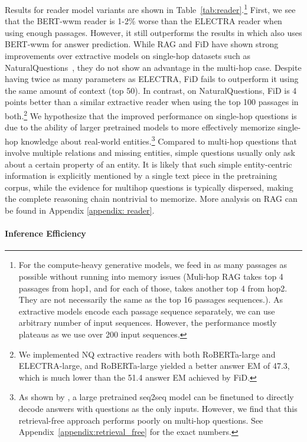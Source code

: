 \documentclass{article} \usepackage{iclr2021_conference,times}
\begin{document}
Results for reader model variants are shown in Table~\ref{tab:reader}.\footnote{For the compute-heavy generative models, we feed in as many passages as possible without running into memory issues (Muli-hop RAG takes top 4 passages from hop1, and for each of those, takes another top 4 from hop2. They are not necessarily the same as the top 16 passages sequences.). As extractive models encode each passage sequence separately, we can use arbitrary number of input sequences. However, the performance mostly plateaus as we use over 200 input sequences.}
First, we see that the BERT-wwm reader is 1-2\% worse than the ELECTRA reader when using enough passages. However, it still outperforms the results in \citep{GraphRecurrentRetriever} which also uses BERT-wwm for answer prediction.
While RAG and FiD have shown strong improvements over extractive models on single-hop datasets such as NaturalQuestions~\citep{NQ}, they do not show an advantage in the multi-hop case. Despite having twice as many parameters as ELECTRA, FiD fails to outperform it using the same amount of context (top 50). 
In contrast, on NaturalQuestions, FiD is 4 points better than a similar extractive reader when using the top 100 passages in both.\footnote{We implemented NQ extractive readers with both RoBERTa-large and ELECTRA-large, and RoBERTa-large yielded a better answer EM of 47.3, which is much lower than the 51.4 answer EM achieved by FiD.}
We hypothesize that the improved performance on single-hop questions is due to the ability of larger pretrained models to more effectively memorize single-hop knowledge about real-world entities.\footnote{As shown by \citet{t5close}, a large pretrained seq2seq model can be finetuned to directly decode answers with questions as the only inputs. However, we find that this retrieval-free approach performs poorly on multi-hop questions. See Appendix~\ref{appendix:retrieval_free} for the exact numbers.}
Compared to multi-hop questions that involve multiple relations and missing entities, simple questions usually only ask about a certain property of an entity. It is likely that such simple entity-centric information is explicitly mentioned by a single text piece in the pretraining corpus, while the evidence for multihop questions is typically dispersed, making the complete reasoning chain nontrivial to memorize. More analysis on RAG can be found in Appendix \ref{appendix: reader}.







\paragraph{Inference Efficiency}
\label{sec:qa_analysis}
\end{document}

